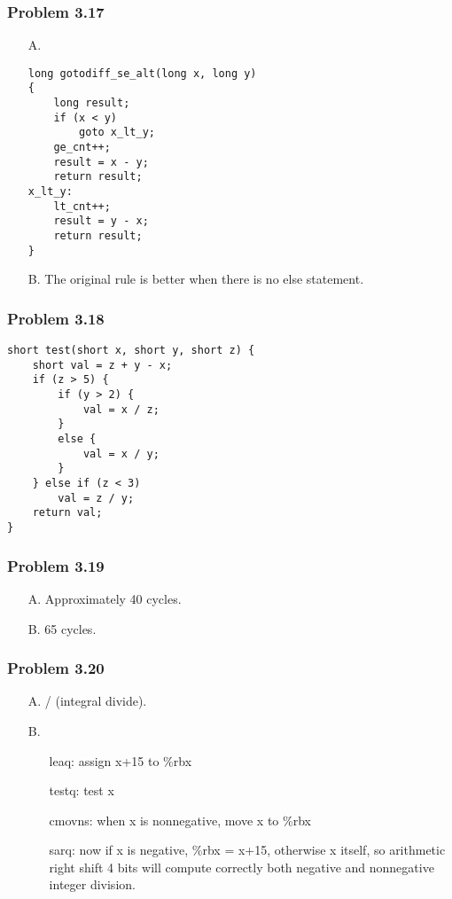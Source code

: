 \documentclass[a4paper]{article}
\begin{document}
\subsubsection*{Problem 3.17}
\begin{enumerate}
    \item[A.]
\begin{lstlisting}
long gotodiff_se_alt(long x, long y) 
{ 
    long result; 
    if (x < y) 
        goto x_lt_y; 
    ge_cnt++;
    result = x - y;
    return result;
x_lt_y:
    lt_cnt++;
    result = y - x;
    return result;
}
\end{lstlisting} 
    \item[B.] The original rule is better when there is no else statement.
\end{enumerate}

\subsubsection*{Problem 3.18}
\begin{lstlisting}
short test(short x, short y, short z) {
    short val = z + y - x;
    if (z > 5) {
        if (y > 2) {
            val = x / z;
        }
        else {
            val = x / y;
        }
    } else if (z < 3) 
        val = z / y;
    return val;
}
\end{lstlisting}

\subsubsection*{Problem 3.19}
\begin{enumerate}
    \item [A.] Approximately 40 cycles.
    \item [B.] 65 cycles.
\end{enumerate}

\subsubsection*{Problem 3.20}
\begin{enumerate}
    \item [A.] / (integral divide).
    \item [B.] 
    \begin{enumerate}
        \item [leaq:] assign x+15 to \%rbx
        \item [testq:] test x
        \item [cmovns:] when x is nonnegative, move x to \%rbx
        \item [sarq:] now if x is negative, \%rbx = x+15, otherwise x itself, so arithmetic right shift 4 bits will compute correctly both negative and nonnegative integer division.
    \end{enumerate}
\end{enumerate}
\end{document}
